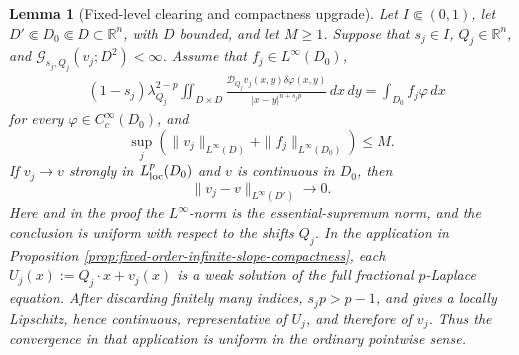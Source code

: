 \documentclass[11pt,reqno]{amsart}
\numberwithin{equation}{section}
\newcommand{\R}{\mathbb R}
\newcommand{\dd}{\,d}
\newtheorem{lemma}[theorem]{Lemma}
\theoremstyle{remark}
\begin{document}
\begin{lemma}[Fixed-level clearing and compactness upgrade]
\label{lem:shift-uniform-fixed-level-clearing}
Let \(I\Subset(0,1)\), let
\(D'\Subset D_0\Subset D\subset\R^n\), with \(D\) bounded, and let
\(M\ge1\).  Suppose that \(s_j\in I\), \(Q_j\in\R^n\), and
\(\mathscr G_{s_j,Q_j}(v_j;D^2)<\infty\).  Assume that
\(f_j\in L^\infty(D_0)\),
\begin{equation}
 \begin{split}
 &(1-s_j)\lambda_{Q_j}^{2-p}
 \iint_{D\times D}
 \frac{\mathcal D_{Q_j}v_j(x,y)\delta\varphi(x,y)}
 {|x-y|^{n+s_jp}}\dd x\!\dd y
 =\int_{D_0}f_j\varphi\dd x
 \end{split}
 \label{eq:shifted-regional-source}
\end{equation}
for every \(\varphi\in C_c^\infty(D_0)\), and
\begin{equation}
 \sup_j\left(
 \|v_j\|_{L^\infty(D)}+\|f_j\|_{L^\infty(D_0)}\right)\le M.
 \label{eq:shifted-regional-source-bounds}
\end{equation}
If \(v_j\to v\) strongly in \(L^p_{\rm loc}(D_0)\) and \(v\) is
continuous in \(D_0\), then
\begin{equation}
 \|v_j-v\|_{L^\infty(D')}\longrightarrow0.
 \label{eq:shift-uniform-local-uniform-upgrade}
\end{equation}
Here and in the proof the \(L^\infty\)-norm is the essential-supremum
norm, and the conclusion is uniform with respect to the shifts \(Q_j\).
In the application in Proposition
\ref{prop:fixed-order-infinite-slope-compactness}, each
\(U_j(x):=Q_j\cdot x+v_j(x)\) is a weak solution of the full fractional
\(p\)-Laplace equation.  After discarding finitely many indices,
\(s_jp>p-1\), and
\cite[Theorem~1.1]{BiswasTopp} gives a locally Lipschitz, hence
continuous, representative of \(U_j\), and therefore of \(v_j\).
Thus the convergence in that application is uniform in the ordinary
pointwise sense.
\end{lemma}
\end{document}
